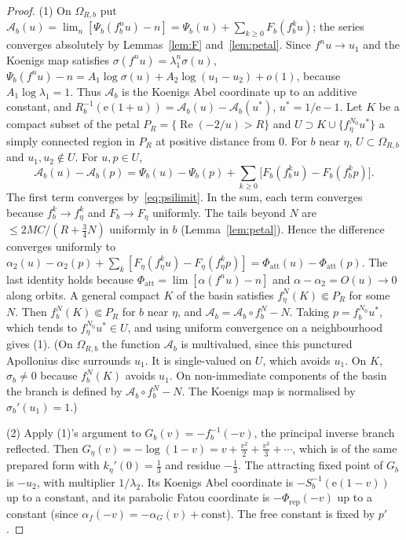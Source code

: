 \documentclass[11pt]{amsart}
\theoremstyle{definition}
\newcommand{\Rr}{R}
\newcommand{\eee}{\mathrm{e}}
\begin{document}
\begin{proof}
(1) On $\Omega_{R,b}$ put
$\mathcal A_b(u)=\lim_n[\Psi_b(f_b^nu)-n]=\Psi_b(u)+\sum_{k\ge0}F_b(f_b^ku)$;
the series converges absolutely by Lemmas~\ref{lem:F} and~\ref{lem:petal}.
Since $f^nu\to u_1$ and the Koenigs map satisfies
$\sigma(f^nu)=\lambda_1^n\sigma(u)$,
$\Psi_b(f^nu)-n=A_1\log\sigma(u)+A_2\log(u_1-u_2)+o(1)$, because
$A_1\log\lambda_1=1$.  Thus $\mathcal A_b$ is the Koenigs Abel coordinate up to
an additive constant, and
$\Rr_b^{-1}(\eee(1+u))=\mathcal A_b(u)-\mathcal A_b(u^*)$, $u^*=1/\eee-1$.
Let $K$ be a compact subset of the petal
$P_R=\{\operatorname{Re}(-2/u)>R\}$ and $U\supset K\cup\{f_\eta^{N_0}u^*\}$ a
simply connected region in $P_R$ at positive distance from $0$.  For $b$ near
$\eta$, $U\subset\Omega_{R,b}$ and $u_1,u_2\notin U$.  For $u,p\in U$,
\[
 \mathcal A_b(u)-\mathcal A_b(p)=\Psi_b(u)-\Psi_b(p)
 +\sum_{k\ge0}\bigl[F_b(f_b^ku)-F_b(f_b^kp)\bigr].
\]
The first term converges by~\eqref{eq:psilimit}.  In the sum, each term
converges because $f_b^k\to f_\eta^k$ and $F_b\to F_\eta$ uniformly.  The tails
beyond $N$ are $\le 2MC/(R+\tfrac34N)$ uniformly in $b$ (Lemma~\ref{lem:petal}).
Hence the difference converges uniformly to
$\alpha_2(u)-\alpha_2(p)+\sum_k[F_\eta(f_\eta^ku)-F_\eta(f_\eta^kp)]
 =\Phi_{\mathrm{att}}(u)-\Phi_{\mathrm{att}}(p)$.  The last identity holds
because $\Phi_{\mathrm{att}}=\lim[\alpha(f^nu)-n]$ and
$\alpha-\alpha_2=O(u)\to0$ along orbits.  A general compact $K$ of the basin
satisfies $f_\eta^{N}(K)\Subset P_R$ for some $N$.  Then
$f_b^N(K)\Subset P_R$ for $b$ near $\eta$, and
$\mathcal A_b=\mathcal A_b\circ f_b^N-N$.  Taking $p=f_b^{N_0}u^*$, which
tends to $f_\eta^{N_0}u^*\in U$, and using uniform convergence on a
neighbourhood gives (1).  (On $\Omega_{R,b}$ the function $\mathcal A_b$ is
multivalued, since this punctured Apollonius disc surrounds $u_1$.
It is single-valued on $U$, which
avoids $u_1$.  On $K$, $\sigma_b\ne0$ because $f_b^N(K)$ avoids $u_1$.  On
non-immediate components of the basin the branch is defined by
$\mathcal A_b\circ f_b^N-N$.  The Koenigs map is normalised by
$\sigma_b'(u_1)=1$.)

(2) Apply (1)'s argument to $G_b(v)=-f_b^{-1}(-v)$, the principal inverse
branch reflected.  Then $G_\eta(v)=-\log(1-v)=v+\tfrac{v^2}2+\tfrac{v^3}3+\cdots$,
which is of the same prepared form with $k_\eta'(0)=\tfrac13$ and residue
$-\tfrac13$.  The attracting fixed point of $G_b$ is $-u_2$, with multiplier
$1/\lambda_2$.  Its Koenigs Abel coordinate is $-S_b^{-1}(\eee(1-v))$ up to a
constant, and its parabolic Fatou coordinate is $-\Phi_{\mathrm{rep}}(-v)$ up
to a constant (since $\alpha_{f}(-v)=-\alpha_{G}(v)+\text{const}$).  The free
constant is fixed by $p'$.
\end{proof}
\end{document}
